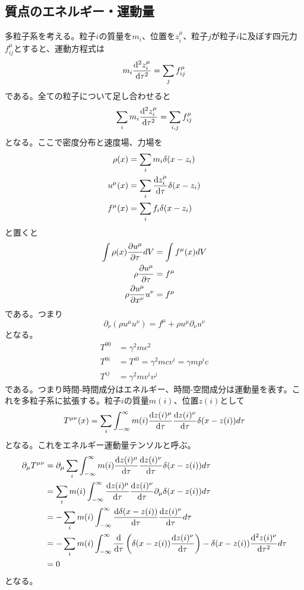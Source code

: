 \subsection{質点のエネルギー・運動量}
    多粒子系を考える。粒子$i$の質量を$m_i$、位置を$z_i^\mu$、粒子$j$が粒子$i$に及ぼす四元力$f_{ij}^\mu$とすると、運動方程式は
        \[m_i\dv[2]{z_i^\mu}{\tau} = \sum_j f_{ij}^\mu\]
    である。全ての粒子について足し合わせると
        \[\sum_i m_i \dv[2]{z_i^\mu}{\tau} = \sum_{i, j} f_{ij}^\mu\]
    となる。ここで密度分布と速度場、力場を
    \begin{align*}
        \rho(x) &= \sum_i m_i \delta(x - z_i)\\
        u^\mu(x) &= \sum_i \dv{z_i^\mu}{\tau} \delta(x - z_i)\\
        f^\mu(x) &= \sum_i f_i \delta(x - z_i)
    \end{align*}
    と置くと
    \begin{align*}
        \int \rho(x)\pdv{u^\mu}{\tau}(x) dV &= \int f^\mu(x) dV\\
        \rho \pdv{u^\mu}{\tau} &= f^\mu\\
        \rho \pdv{u^\mu}{x^\nu}u^\nu &= f^\mu
    \end{align*}
    である。つまり
        \[\partial_\nu(\rho u^\mu u^\nu) = f^\mu + \rho u^\mu \partial_\nu u^\nu\]
    となる。
    \begin{align*}
        T^{00} &= \gamma^2 mc^2\\
        T^{0i} &= T^{i0} = \gamma^2 mcv^i = \gamma m p^i c\\
        T^{ij} &= \gamma^2 m v^i v^j
    \end{align*}
    である。つまり時間-時間成分はエネルギー、時間-空間成分は運動量を表す。これを多粒子系に拡張する。粒子$i$の質量$m(i)$、位置$z(i)$として
    \begin{align*}
        T^{\mu\nu}(x) = \sum_i \int_{-\infty}^\infty m(i)\dv{z(i)^\mu}{\tau}\dv{z(i)^\nu}{\tau}\delta(x - z(i)) d\tau
    \end{align*}
    となる。これをエネルギー運動量テンソルと呼ぶ。
    \begin{align*}
        \partial_\mu T^{\mu\nu}
            &= \partial_\mu \sum_i \int_{-\infty}^\infty m(i)\dv{z(i)^\mu}{\tau}\dv{z(i)^\nu}{\tau}\delta(x - z(i)) d\tau\\
            &= \sum_i m(i) \int_{-\infty}^\infty \dv{z(i)^\mu}{\tau}\dv{z(i)^\nu}{\tau} \partial_\mu \delta(x - z(i)) d\tau\\
            &= -\sum_i m(i) \int_{-\infty}^\infty \dv{\delta(x - z(i))}{\tau}\dv{z(i)^\nu}{\tau} d\tau\\
            &= -\sum_i m(i) \int_{-\infty}^\infty \dv{\tau}\left(\delta(x - z(i))\dv{z(i)^\nu}{\tau}\right) - \delta(x - z(i))\dv[2]{z(i)^\nu}{\tau} d\tau\\
            &= 0
    \end{align*}
    となる。

